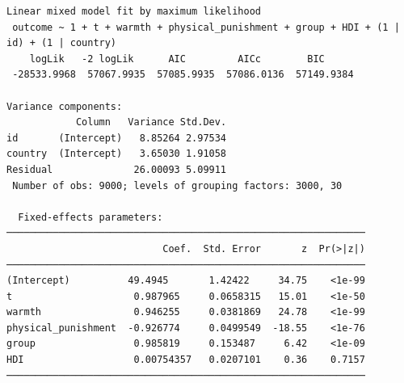 \documentclass[
  letterpaper,
  DIV=11,
  numbers=noendperiod]{scrreprt}
\begin{document}
\begin{verbatim}
Linear mixed model fit by maximum likelihood
 outcome ~ 1 + t + warmth + physical_punishment + group + HDI + (1 | id) + (1 | country)
    logLik   -2 logLik      AIC         AICc        BIC     
 -28533.9968  57067.9935  57085.9935  57086.0136  57149.9384

Variance components:
            Column   Variance Std.Dev.
id       (Intercept)   8.85264 2.97534
country  (Intercept)   3.65030 1.91058
Residual              26.00093 5.09911
 Number of obs: 9000; levels of grouping factors: 3000, 30

  Fixed-effects parameters:
──────────────────────────────────────────────────────────────
                           Coef.  Std. Error       z  Pr(>|z|)
──────────────────────────────────────────────────────────────
(Intercept)          49.4945       1.42422     34.75    <1e-99
t                     0.987965     0.0658315   15.01    <1e-50
warmth                0.946255     0.0381869   24.78    <1e-99
physical_punishment  -0.926774     0.0499549  -18.55    <1e-76
group                 0.985819     0.153487     6.42    <1e-09
HDI                   0.00754357   0.0207101    0.36    0.7157
──────────────────────────────────────────────────────────────
\end{verbatim}
\end{document}
